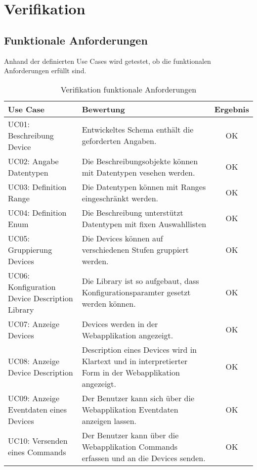 \chapter{Verifikation}
\label{chap:verification}

\section{Funktionale Anforderungen}
Anhand der definierten Use Cases wird getestet, ob die funktionalen Anforderungen erfüllt sind.


\begin{table}[H]
\begin{tabularx}{\textwidth}{|l|X|c|}

 \hline \rowcolor{lightgray}
 {\bf Use Case } & {\bf Bewertung } & {\bf Ergebnis} \\  \hline
 
 UC01: Beschreibung Device & Entwickeltes Schema enthält die geforderten Angaben. & OK \\ \hline

 UC02: Angabe Datentypen   & Die Beschreibungsobjekte können mit Datentypen vesehen werden. & OK \\ \hline

 UC03: Definition Range    & Die Datentypen können mit Ranges eingeschränkt werden. & OK \\ \hline

 UC04: Definition Enum     & Die Beschreibung unterstützt Datentypen mit fixen Auswahllisten & OK \\ \hline

 UC05: Gruppierung Devices & Die Devices können auf verschiedenen Stufen gruppiert werden. & OK \\ \hline

 UC06: Konfiguration Device Description Library & Die Library ist so aufgebaut, dass  Konfigurationsparamter gesetzt werden können. & OK \\ \hline

 UC07: Anzeige Devices & Devices werden in der Webapplikation angezeigt. & OK \\ \hline

 UC08: Anzeige Device Description & Description eines Devices wird in Klartext und in interpretierter Form in der Webapplikation angezeigt. & OK \\ \hline

 UC09: Anzeige Eventdaten eines Devices & Der Benutzer kann sich über die Webapplikation Eventdaten anzeigen lassen. & OK \\ \hline

 UC10: Versenden eines Commands & Der Benutzer kann über die Webapplikation Commands erfassen und an die Devices senden. & OK \\ \hline

\end{tabularx}
\caption{Verifikation funktionale Anforderungen}
\end{table}





